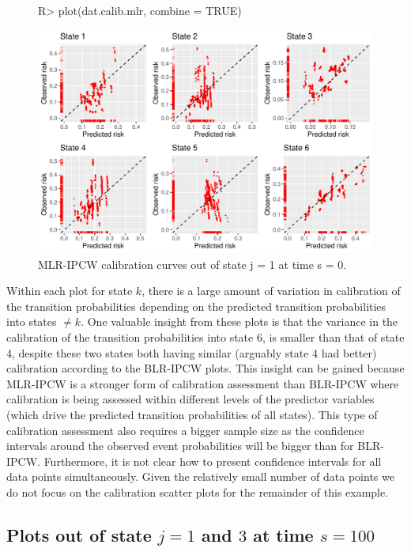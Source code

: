 \documentclass[nojss]{jss}
\begin{document}
\begin{figure}
\centering
\begin{Schunk}
\begin{Sinput}
R> plot(dat.calib.mlr, combine = TRUE)
\end{Sinput}
\end{Schunk}
\includegraphics{overview-008}
\caption{\label{fig:mlrj1s0} MLR-IPCW calibration curves out of state j =  1 at time s = 0.}
\end{figure}

Within each plot for state $k$, there is a large amount of variation in calibration of the transition probabilities depending on the predicted transition probabilities into states $\neq k$. One valuable insight from these plots is that the variance in the calibration of the transition probabilities into state $6$, is smaller than that of state $4$, despite these two states both having similar (arguably state $4$ had better) calibration according to the BLR-IPCW plots. This insight can be gained because MLR-IPCW is a stronger form of calibration assessment than BLR-IPCW where calibration is being assessed within different levels of the predictor variables (which drive the predicted transition probabilities of all states). This type of calibration assessment also requires a bigger sample size as the confidence intervals around the observed event probabilities will be bigger than for BLR-IPCW. Furthermore, it is not clear how to present confidence intervals for all data points simultaneously. Given the relatively small number of data points we do not focus on the calibration scatter plots for the remainder of this example.

\subsection[Plots out of state j = 1 and 3 at time s = 100]{Plots out of state $j = 1$ and $3$ at time $s = 100$} \label{sec:plotss100}
\end{document}
